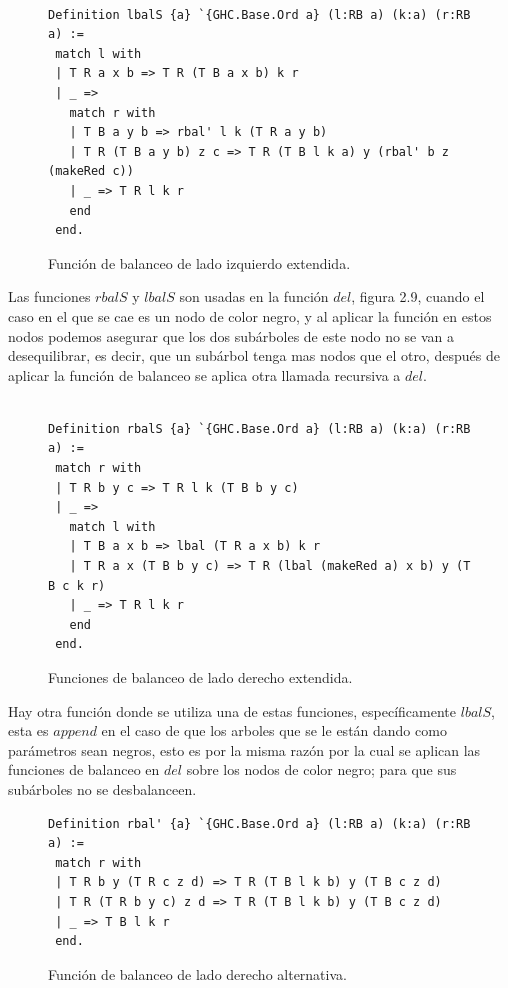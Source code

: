 \documentclass[8pt,leqno,pdflatex,spanish]{book}
\theoremstyle{plain}
\theoremstyle{definition}
\theoremstyle{remark}
\begin{document}
\begin{figure}
\centering 
\captionsetup{justification=centering}
\begin{verbatim}

Definition lbalS {a} `{GHC.Base.Ord a} (l:RB a) (k:a) (r:RB a) :=
 match l with
 | T R a x b => T R (T B a x b) k r
 | _ =>
   match r with
   | T B a y b => rbal' l k (T R a y b)
   | T R (T B a y b) z c => T R (T B l k a) y (rbal' b z (makeRed c))
   | _ => T R l k r 
   end
 end.

\end{verbatim}
\caption{Funci\'on de balanceo de lado izquierdo extendida.}
\end{figure}

Las funciones $rbalS$ y $lbalS$ son usadas en la funci\'on $del$, figura 2.9, cuando el caso en el 
que se cae es un nodo de color negro, y al aplicar la funci\'on en estos nodos podemos asegurar 
que los dos subárboles de este nodo no se van a desequilibrar, es decir, que un subárbol tenga mas 
nodos que el otro, después de aplicar la función de balanceo se aplica otra llamada recursiva a 
$del$.


\begin{figure}
\centering 
\captionsetup{justification=centering}
\begin{verbatim}

Definition rbalS {a} `{GHC.Base.Ord a} (l:RB a) (k:a) (r:RB a) :=
 match r with
 | T R b y c => T R l k (T B b y c)
 | _ =>
   match l with
   | T B a x b => lbal (T R a x b) k r
   | T R a x (T B b y c) => T R (lbal (makeRed a) x b) y (T B c k r)
   | _ => T R l k r 
   end
 end.

\end{verbatim}
\caption{Funciones de balanceo de lado derecho extendida.}
\end{figure}

Hay otra función donde se utiliza una de estas funciones, específicamente $lbalS$, esta es $append$
en el caso de que los arboles que se le están dando como parámetros sean negros, esto es por la 
misma razón por la cual se aplican las funciones de balanceo en $del$ sobre los nodos de color 
negro; para que sus subárboles no se desbalanceen. 

\begin{figure}
\centering 
\captionsetup{justification=centering}
\begin{verbatim}
Definition rbal' {a} `{GHC.Base.Ord a} (l:RB a) (k:a) (r:RB a) :=
 match r with
 | T R b y (T R c z d) => T R (T B l k b) y (T B c z d)
 | T R (T R b y c) z d => T R (T B l k b) y (T B c z d)
 | _ => T B l k r
 end.

\end{verbatim}
\caption{Funci\'on de balanceo de lado derecho alternativa.}
\end{figure}
\end{document}
